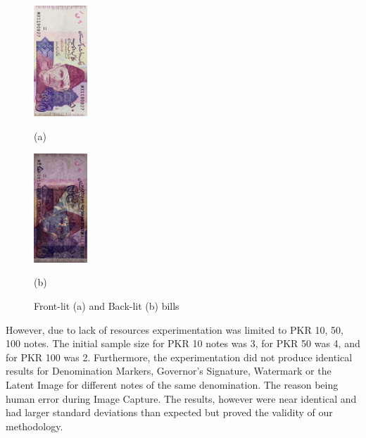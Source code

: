 \documentclass{article}
\begin{document}
\begin{figure}[h]
\begin{minipage}[b]{.48\linewidth}
  \centering
  \centerline{\includegraphics[width=2.0cm]{note1.png}}
  \centerline{(a)}%
  \vspace{-4mm}
\end{minipage}
\hfill
\begin{minipage}[b]{0.48\linewidth}
  \centering
  \centerline{\includegraphics[width=2.0cm]{note2.png}}
  \centerline{(b)}%
  \vspace{-4mm}
\end{minipage}
\caption{Front-lit (a) and Back-lit (b) bills}
\label{fig:frontbacklit}
\vspace{-2mm}
\end{figure}
\newpage
However, due to lack of resources experimentation was limited to PKR 10, 50, 100 notes. The initial sample size for PKR 10 notes was 3, for PKR 50 was 4, and for PKR 100 was 2. Furthermore, the experimentation did not produce identical results for Denomination Markers, Governor's Signature, Watermark or the Latent Image for different notes of the same denomination. The reason being human error during Image Capture. The results, however were near identical and had larger standard deviations than expected but proved the validity of our methodology.
\end{document}
